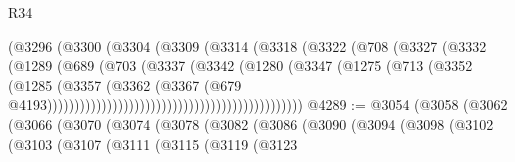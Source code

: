 \begin{lexlean}{R34}
\begin{coremodule}
                                                (@3296
                                                  (@3300
                                                    (@3304
                                                      (@3309
                                                        (@3314
                                                          (@3318
                                                            (@3322
                                                              (@708
                                                                (@3327
                                                                  (@3332
                                                                    (@1289
                                                                      (@689
                                                                        (@703
                                                                          (@3337
                                                                            (@3342
                                                                              (@1280
                                                                                (@3347
                                                                                  (@1275
                                                                                    (@713
                                                                                      (@3352
                                                                                        (@1285
                                                                                          (@3357
                                                                                            (@3362
                                                                                              (@3367
                                                                                                (@679
                                                                                                  @4193)))))))))))))))))))))))))))))))))))))))))))))))
@4289 := @3054
    (@3058
      (@3062
        (@3066
          (@3070
            (@3074
              (@3078
                (@3082
                  (@3086
                    (@3090
                      (@3094
                        (@3098
                          (@3102
                            (@3103
                              (@3107
                                (@3111
                                  (@3115
                                    (@3119
                                      (@3123

\end{coremodule}
\end{lexlean}
